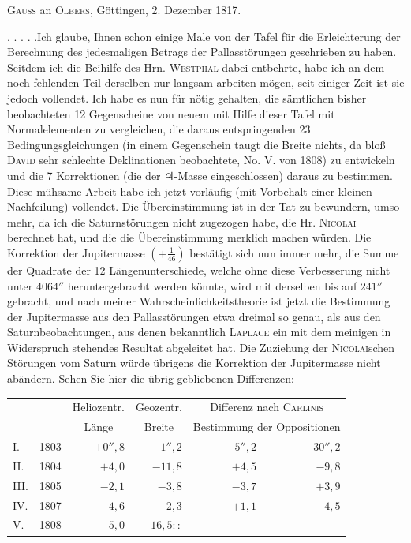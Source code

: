 \par{}\bigskip
\begin{center}
\textsc{Gauss} an \textsc{Olbers}, Göttingen, 2. Dezember 1817.
\end{center}
\noindent\hspace*{\parindent}. . . . .\quad Ich glaube, Ihnen schon einige Male von der Tafel für die Erleichterung der Berechnung des jedesmaligen Betrags der Pallasstörungen geschrieben zu haben. Seitdem ich die Beihilfe des Hrn. \textsc{Westphal} dabei entbehrte, habe ich an dem noch fehlenden Teil derselben nur langsam arbeiten mögen, seit einiger Zeit ist sie jedoch vollendet. Ich habe es nun für nötig gehalten, die sämtlichen bisher beobachteten 12 Gegenscheine von neuem mit Hilfe dieser Tafel mit Normalelementen zu vergleichen, die daraus entspringenden 23 Bedingungsgleichungen (in einem Gegenschein taugt die Breite nichts, da bloß \textsc{David} sehr schlechte Deklinationen beobachtete, No. V. von 1808) zu entwickeln und die 7 Korrektionen (die der {\AstroSymbols ♃}-Masse eingeschlossen) daraus zu bestimmen. Diese mühsame Arbeit habe ich jetzt vorläufig (mit Vorbehalt einer kleinen Nachfeilung) vollendet. Die Übereinstimmung ist in der Tat zu bewundern, umso mehr, da ich die Saturnstörungen nicht zugezogen habe, die Hr. \textsc{Nicolai} berechnet hat, und die die Übereinstimmung merklich  machen würden. Die Korrektion der Jupitermasse \((+\frac{1}{46})\) bestätigt sich nun immer mehr, die Summe der Quadrate der 12 Längenunterschiede, welche ohne diese Verbesserung nicht unter \(4064''\) heruntergebracht werden könnte, wird mit derselben bis auf \(241''\) gebracht, und nach meiner Wahrscheinlichkeitstheorie ist jetzt die Bestimmung der Jupitermasse aus den Pallasstörungen etwa dreimal so genau, als aus den Saturnbeobachtungen, aus denen bekanntlich \textsc{Laplace} ein mit dem meinigen in Widerspruch stehendes Resultat abgeleitet hat. Die Zuziehung der \textsc{Nicolai}schen Störungen vom Saturn würde übrigens die Korrektion der Jupitermasse nicht abändern. Sehen Sie hier die übrig gebliebenen Differenzen:
\begin{center}
\begingroup\small\setlength{\tabcolsep}{5pt}
\begin{tabular}{@{}lr r r r r@{}}
&&\multicolumn{1}{c}{Heliozentr.}&\multicolumn{1}{c}{Geozentr.}&\multicolumn{2}{c}{Differenz nach \textsc{Carlinis}}\\
&&\multicolumn{1}{c}{Länge}&\multicolumn{1}{c}{Breite}&\multicolumn{2}{c}{Bestimmung der Oppositionen}\\[3pt]
I.&1803&\(+0''{,}8\)&\(-1''{,}2\)&\(-5''{,}2\)&\(-30''{,}2\)\\
II.&1804&\(+4{,}0\)&\(-11{,}8\)&\(+4{,}5\)&\(-9{,}8\)\\
III.&1805&\(-2{,}1\)&\(-3{,}8\)&\(-3{,}7\)&\(+3{,}9\)\\
IV.&1807&\(-4{,}6\)&\(-2{,}3\)&\(+1{,}1\)&\(-4{,}5\)\\
V.&1808&\(-5{,}0\)&\(-16{,}5\mathpunct{::}\)&&
\end{tabular}
\endgroup
\end{center}
